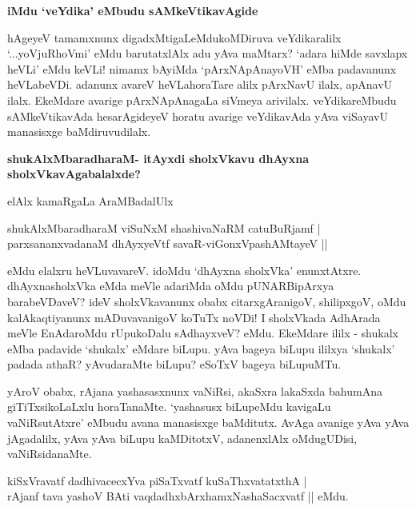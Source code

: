 {\bigskip
\noindent
{\large\bf iMdu `veYdika' eMbudu sAMkeVtikavAgide}}\label{page206}
\medskip

\noindent
hAgeyeV tamamxnunx digadxMtigaLeMdukoMDiruva veYdikaralilx `...yoVjuRhoVmi' eMdu barutatxlAlx adu yAva maMtarx? `adara hiMde savxlapx heVLi' eMdu keVLi! nimamx bAyiMda `pArxNApAnayoVH' eMba padavanunx heVLabeVDi. adanunx avareV heVLahoraTare alilx pArxNavU ilalx, apAnavU ilalx. EkeMdare avarige pArxNApAnagaLa siVmeya arivilalx. veYdikareMbudu sAMkeVtikavAda hesarAgideyeV horatu avarige veYdikavAda yAva viSayavU manasisxge baMdiruvudilalx.

{\bigskip
\noindent
{\large\bf shukAlxMbaradharaM- itAyxdi sholxVkavu dhAyxna sholxVkavAgabalalxde?}}\label{page206a}
\medskip

\noindent
elAlx kamaRgaLa AraMBadalUlx

\begin{shloka}
shukAlxMbaradharaM viSuNxM shashivaNaRM catuBuRjamf |\\\label{207}
parxsananxvadanaM dhAyxyeVtf savaR-viGonxVpashAMtayeV ||
\end{shloka}

\noindent
eMdu elalxru heVLuvavareV. idoMdu `dhAyxna sholxVka' enunxtAtxre. dhAyxnasholxVka eMda meVle adariMda oMdu pUNARBipArxya barabeVDaveV? ideV sholxVkavanunx obabx citarxgAranigoV, shilipxgoV, oMdu kalAkaqtiyanunx mADuvavanigoV koTuTx noVDi! I sholxVkada AdhArada meVle EnAdaroMdu rUpukoDalu sAdhayxveV? eMdu. EkeMdare ililx - shukalx eMba padavide `shukalx' eMdare biLupu. yAva bageya biLupu ililxya `shukalx' padada athaR? yAvudaraMte biLupu? eSoTxV bageya biLupuMTu. 

yAroV obabx, rAjana yashasasxnunx vaNiRsi, akaSxra lakaSxda bahumAna giTiTxsikoLaLxlu horaTanaMte. `yashasusx biLupeMdu kavigaLu vaNiRsutAtxre' eMbudu avana manasisxge baMditutx. AvAga avanige yAva yAva jAgadalilx, yAva yAva biLupu kaMDitotxV, adanenxlAlx oMdugUDisi, vaNiRsidanaMte.

\begin{shloka}
kiSxVravatf dadhivacecxYva piSaTxvatf kuSaThxvatatxthA |\\\label{207a}
rAjanf tava yashoV BAti vaqdadhxbArxhamxNashaSacxvatf || eMdu.
\end{shloka}

